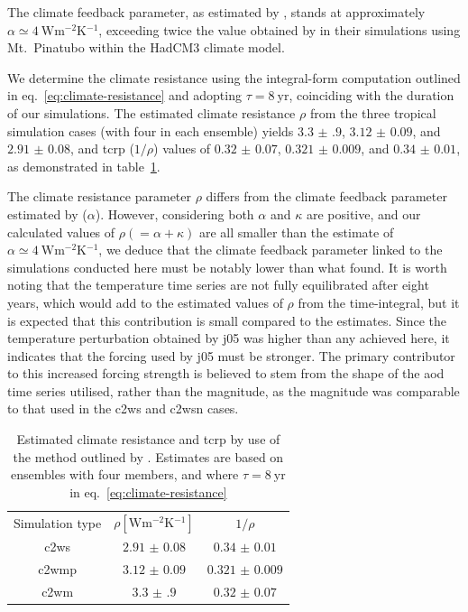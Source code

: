 \documentclass{ametsocV6.1}
\begin{document}
The climate feedback parameter, as estimated by \citet{jones2005}, stands at
approximately \(\alpha \simeq \SI{4}{\watt\metre^{-2}\kelvin^{-1}}\), exceeding twice
the value obtained by \citet{gregory2016} in their simulations using Mt.\ Pinatubo
within the HadCM3 climate model.

We determine the climate resistance using the integral-form computation outlined in
eq.~\ref{eq:climate-resistance} and adopting \(\tau =\SI{8}{\mathrm{yr}}\), coinciding
with the duration of our simulations. The estimated climate resistance \(\rho \) from
the three tropical simulation cases (with four in each ensemble) yields
\(\num{3.3(9)}\), \(\num{3.12(9)}\), and \(\num{2.91(8)}\), and \gls{tcrp} (\(1/\rho\))
values of \(\num{0.32(7)}\), \(\num{0.321(9)}\), and \(\num{0.34(1)}\), as demonstrated
in table~\ref{tab:trcp}.

The climate resistance parameter \(\rho\) differs from the climate feedback parameter
estimated by \citet{jones2005} (\(\alpha\)). However, considering both \(\alpha \) and
\(\kappa \) are positive, and our calculated values of \(\rho (=\alpha +\kappa) \) are
all smaller than the \citet{jones2005} estimate of \(\alpha \simeq
\SI{4}{\watt\metre^{-2}\kelvin^{-1}}\), we deduce that the climate feedback parameter
linked to the simulations conducted here must be notably lower than what
\citet{jones2005} found. It is worth noting that the temperature time series are not
fully equilibrated after eight years, which would add to the estimated values of \(\rho
\) from the time-integral, but it is expected that this contribution is small compared
to the estimates. Since the temperature perturbation obtained by \gls{j05} was higher
than any achieved here, it indicates that the forcing used by \gls{j05} must be
stronger. The primary contributor to this increased forcing strength is believed to stem
from the shape of the \gls{aod} time series utilised, rather than the magnitude, as the
magnitude was comparable to that used in the \gls{c2ws} and \gls{c2wsn} cases.

\begin{table}
  \centering

  \caption{Estimated climate resistance and \gls{tcrp} by use of the method outlined by
    \citet{merlis2014}. Estimates are based on ensembles with four members, and where \(\tau
    =\SI{8}{\mathrm{yr}}\) in eq.~\ref{eq:climate-resistance}}\label{tab:trcp}%
  \begin{tabular}{ccc}
    Simulation type & \(\rho [\si{\watt\metre^{-2}\kelvin^{-1}}]\) & \(1/\rho\)         \\
    \gls{c2ws}      & \(\num{2.91(8)}\)                            & \(\num{0.34(1)}\)  \\
    \gls{c2wmp}     & \(\num{3.12(9)}\)                            & \(\num{0.321(9)}\) \\
    \gls{c2wm}      & \(\num{3.3(9)}\)                             & \(\num{0.32(7)}\)  \\
  \end{tabular}
\end{table}
\end{document}
